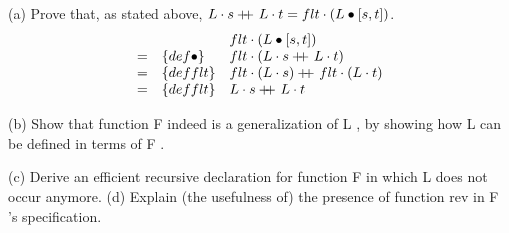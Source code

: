 \documentclass[12pt]{article}
\newcommand\doubleplus{+\kern-1.3ex+\kern0.8ex}
\begin{document}
(a) Prove that, as stated above, $L\cdot s\doubleplus L\cdot t = flt\cdot (L\bullet[s,t])$.
    \begin{displaymath}\begin{array}{lll}
         & & flt \cdot (L \bullet [s,t]) \\
        = & \{ def \bullet \} & flt \cdot (L\cdot s \doubleplus L\cdot t) \\
        = & \{ def flt \} & flt \cdot (L\cdot s ) \doubleplus  flt \cdot (L\cdot t) \\
        = & \{ def flt \} & L\cdot s \doubleplus  L\cdot t \\
    \end{array}\end{displaymath}



(b) Show that function F indeed is a generalization of L , by showing how L can be defined in terms of F .



(c) Derive an efficient recursive declaration for function F in which L does not occur anymore.
(d) Explain (the usefulness of) the presence of function rev in F ’s specification.    
	
	
	\begin{thebibliography}{XXXX}
		
		
	\end{thebibliography}
	
\end{document}
